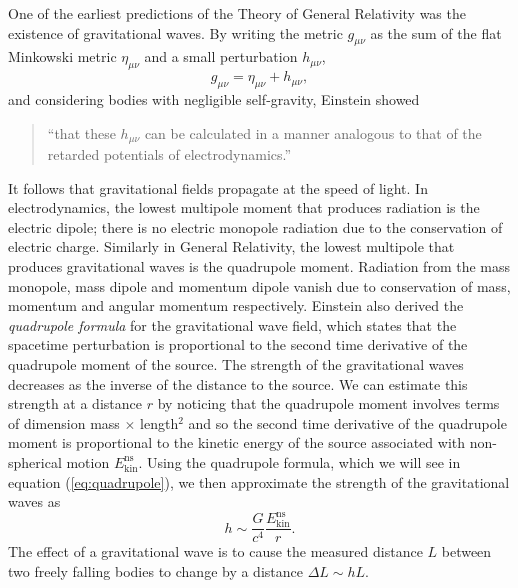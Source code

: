One of the earliest predictions of the Theory of General Relativity was the
existence of gravitational waves. By writing the metric $g_{\mu\nu}$ as the sum
of the flat Minkowski metric $\eta_{\mu\nu}$ and a small perturbation $h_{\mu\nu}$, 
\begin{equation}
g_{\mu\nu} = \eta_{\mu\nu} + h_{\mu\nu},
\end{equation}
and considering bodies with negligible self-gravity, 
Einstein showed\cite{Einstein:1916}
\begin{quotation}
``that these $h_{\mu\nu}$ can be calculated in a manner analogous to that of
the retarded potentials of electrodynamics.''
\end{quotation}
It follows that
gravitational fields propagate at the speed of light.  In electrodynamics, the
lowest multipole moment that produces radiation is the electric dipole; there
is no electric monopole radiation due to the conservation of electric charge.
Similarly in General Relativity, the lowest multipole that produces
gravitational waves is the quadrupole moment. Radiation from the 
mass monopole, mass dipole and momentum dipole vanish due to conservation of
mass, momentum and angular momentum respectively. Einstein also derived the
\emph{quadrupole formula} for the gravitational wave field, which states that
the spacetime perturbation is proportional to the second time derivative of
the quadrupole moment of the source.  The strength of the gravitational waves
decreases as the inverse of the distance to the source.  We can estimate
this strength at a distance $r$ by noticing that the quadrupole moment
involves terms of dimension mass $\times$ length$^2$ and so the second time
derivative of the quadrupole moment is proportional to the kinetic energy of
the source associated with non-spherical motion $E^\mathrm{ns}_\mathrm{kin}$.
Using the quadrupole formula, which we will see in equation
(\ref{eq:quadrupole}), we then approximate the strength of the gravitational
waves as
\begin{equation}
h \sim \frac{G}{c^4}\frac{E^\mathrm{ns}_\mathrm{kin}}{r}.
\label{eq:strainest}
\end{equation}
The effect of a
gravitational wave is to cause the measured distance $L$ between two freely
falling bodies to change by a distance $\Delta L \sim h L$. 

